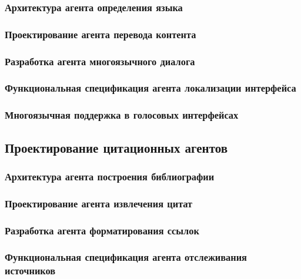 \documentclass{syksu-coursework}
\begin{document}
\subsubsection{Архитектура агента определения языка}

\subsubsection{Проектирование агента перевода контента}

\subsubsection{Разработка агента многоязычного диалога}

\subsubsection{Функциональная спецификация агента локализации интерфейса}

\subsubsection{Многоязычная поддержка в голосовых интерфейсах}

\subsection{Проектирование цитационных агентов}

\subsubsection{Архитектура агента построения библиографии}

\subsubsection{Проектирование агента извлечения цитат}

\subsubsection{Разработка агента форматирования ссылок}

\subsubsection{Функциональная спецификация агента отслеживания источников}
\end{document}
